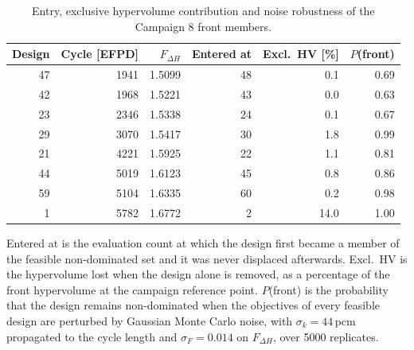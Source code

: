 \begin{table}[htbp]
  \centering
  \begin{threeparttable}
  \caption[Stability of the Campaign 8 front]{Entry, exclusive hypervolume contribution and noise robustness of the Campaign 8 front members.}
  \label{tab:c8-front-stability}
  \begin{tabular}{rrrrrr}
    \toprule
    Design & Cycle [EFPD] & $F_{\Delta H}$ & Entered at & Excl.\ HV [\%] & $P$(front) \\
    \midrule
    47 & 1941 & 1.5099 & 48 & 0.1 & 0.69 \\
    42 & 1968 & 1.5221 & 43 & 0.0 & 0.63 \\
    23 & 2346 & 1.5338 & 24 & 0.1 & 0.67 \\
    29 & 3070 & 1.5417 & 30 & 1.8 & 0.99 \\
    21 & 4221 & 1.5925 & 22 & 1.1 & 0.81 \\
    44 & 5019 & 1.6123 & 45 & 0.8 & 0.86 \\
    59 & 5104 & 1.6335 & 60 & 0.2 & 0.98 \\
    1 & 5782 & 1.6772 & 2 & 14.0 & 1.00 \\
    \bottomrule
  \end{tabular}
  \begin{tablenotes}\footnotesize
    \item Entered at is the evaluation count at which the design first became a member of the feasible non-dominated set and it was never displaced afterwards. Excl.\ HV is the hypervolume lost when the design alone is removed, as a percentage of the front hypervolume at the campaign reference point. $P$(front) is the probability that the design remains non-dominated when the objectives of every feasible design are perturbed by Gaussian Monte Carlo noise, with $\sigma_k = 44$\,pcm propagated to the cycle length and $\sigma_F = 0.014$ on $F_{\Delta H}$, over 5000 replicates.
  \end{tablenotes}
  \end{threeparttable}
\end{table}
